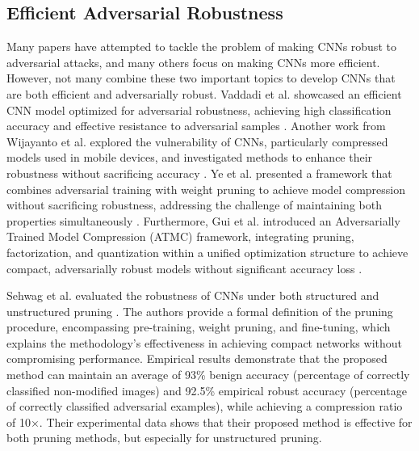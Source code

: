 \documentclass[journal,onecolumn,12pt]{IEEEtran}
\begin{document}
\subsection{Efficient Adversarial Robustness}
Many papers have attempted to tackle the problem of making CNNs robust to adversarial attacks, and many others focus on making CNNs more efficient. However, not many combine these two important topics to develop CNNs that are both efficient and adversarially robust. Vaddadi et al. showcased an efficient CNN model optimized for adversarial robustness, achieving high classification accuracy and effective resistance to adversarial samples \cite{EAR1}. Another work from Wijayanto et al. explored the vulnerability of CNNs, particularly compressed models used in mobile devices, and investigated methods to enhance their robustness without sacrificing accuracy \cite{EAR2}. Ye et al. presented a framework that combines adversarial training with weight pruning to achieve model compression without sacrificing robustness, addressing the challenge of maintaining both properties simultaneously \cite{EAR3}. Furthermore, Gui et al. introduced an Adversarially Trained Model Compression (ATMC) framework, integrating pruning, factorization, and quantization within a unified optimization structure to achieve compact, adversarially robust models without significant accuracy loss \cite{EAR4}. 

Sehwag et al. evaluated the robustness of CNNs under both structured and unstructured pruning \cite{beforehydra}. The authors provide a formal definition of the pruning procedure, encompassing pre-training, weight pruning, and fine-tuning, which explains the methodology's effectiveness in achieving compact networks without compromising performance. Empirical results demonstrate that the proposed method can maintain an average of 93\% benign accuracy (percentage of correctly classified non-modified images) and 92.5\% empirical robust accuracy (percentage of correctly classified adversarial examples), while achieving a compression ratio of 10×. Their experimental data shows that their proposed method is effective for both pruning methods, but especially for unstructured pruning.
\end{document}
